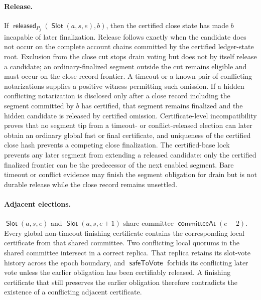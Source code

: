 \documentclass[sigplan,twocolumn,review,anonymous]{acmart}
\newcommand{\func}[1]{\operatorname{\mathsf{#1}}}
\newcommand{\Slot}{\func{Slot}}
\newcommand{\committeeAt}{\func{committeeAt}}
\newcommand{\released}{\func{released}}
\newcommand{\safeToVote}{\func{safeToVote}}
\begin{document}
\paragraph{Release.}
If \(\released_{P_j}(\Slot(a,s,e),b)\), then the certified close state has made \(b\) incapable of
later finalization.  Release follows exactly when the candidate does not occur on the complete account
chains committed by the certified ledger-state root.  Exclusion from the close cut stops drain voting but
does not by itself release a candidate; an ordinary-finalized segment outside the cut remains eligible
and must occur on the close-record frontier.  A timeout or a known pair
of conflicting notarizations supplies a positive witness permitting such omission.  If a hidden
conflicting notarization is disclosed only after a close record including the segment committed by \(b\)
has certified, that segment remains finalized and the hidden candidate is released by certified omission.
Certificate-level incompatibility proves that no segment tip from
a timeout- or conflict-released election can later obtain an ordinary global fast or final certificate,
and uniqueness of the certified close hash prevents a competing close finalization.  The certified-base lock prevents any later segment from extending a released candidate: only the
certified finalized frontier can be the predecessor of the next enabled segment.  Bare timeout or conflict
evidence may finish the segment obligation for drain but is not durable release while the close record remains
unsettled.

\paragraph{Adjacent elections.}
\(\Slot(a,s,e)\) and \(\Slot(a,s,e+1)\) share committee \(\committeeAt(e-2)\).  Every global
non-timeout finishing certificate contains the corresponding local certificate from that shared
committee.  Two conflicting local quorums in the shared committee intersect in a correct replica.
That replica retains its slot-vote history across the epoch boundary, and
\(\safeToVote\) forbids its conflicting later vote unless the earlier obligation has been
certifiably released.  A finishing certificate that still preserves the earlier obligation therefore
contradicts the existence of a conflicting adjacent certificate.
\end{document}
